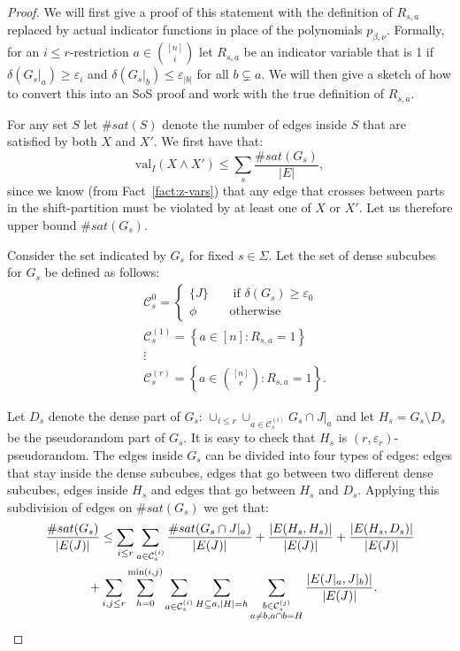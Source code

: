 \documentclass[11pt]{article}
\def \cC {\mathcal{C}}
\def \sos {SoS\xspace}
\def \eps {{\varepsilon}}
\def \val {\mathrm{val}}
\theoremstyle{definition}
\begin{document}
\begin{proof}
We will first give a proof of this statement with the definition of $R_{s,a}$ replaced by actual indicator functions in place of the polynomials $p_{\beta,\nu}$. Formally, for an $i \leq r$-restriction $a \in {[n] \choose i}$ let $R_{s,a}$ be an indicator variable that is 1 if $\delta(G_s|_a) \geq \eps_i$ and $\delta(G_s|_b) \leq \eps_{|b|}$ for all $b \subsetneq a$. We will then give a sketch of how to convert this into an \sos proof and work with the true definition of $R_{s,a}$.

For any set $S$ let $\#sat(S)$ denote the number of edges inside $S$ that are satisfied by both $X$ and $X'$. We first have that:
\begin{equation}\label{eq:edge_cover0}
\val_{I}(X \wedge X') \leq \sum_s \frac{\#sat(G_s)}{|E|},
\end{equation}
since we know (from Fact~\ref{fact:z-vars}) that any edge that crosses between parts in the shift-partition must be violated by at least one of $X$ or $X'$. Let us therefore upper bound $\#sat(G_s)$.


Consider the set indicated by $G_s$ for fixed $s \in \Sigma$. Let the set of dense subcubes for $G_s$ be defined as follows:
\begin{align*}
&\cC^0_s = \begin{cases}\{J\} ~~~~~~~~~\text{if $\delta(G_s) \geq \eps_0$} \\
\phi ~~~~~~~~~~~~\text{otherwise}
\end{cases} \\
&\cC^{(1)}_s = \left\{a \in [n]: R_{s,a} = 1\right\} \\
&\vdots \\
&\cC^{(r)}_s = \left\{a \in {[n] \choose r}: R_{s,a} = 1\right\}. 
\end{align*}


Let $D_s$ denote the dense part of $G_s$: $\cup_{i \leq r} \cup_{a \in \cC^{(i)}_s} G_s \cap J|_a$ and let $H_s = G_s \setminus D_s$ be the pseudorandom part of $G_s$. It is easy to check that $H_s$ is $(r, \eps_r)$-pseudorandom. The edges inside $G_s$ can be divided into four types of edges: edges that stay inside the dense subcubes, edges that go between two different dense subcubes, edges inside $H_s$ and edges that go between $H_s$ and $D_s$. Applying this subdivision of edges on $\#sat(G_s)$ we get that:
\begin{align}
\frac{\#sat(G_s)}{|E(J)|} 
&\leq \sum_{i \leq r} \sum_{a \in \cC^{(i)}_s} \frac{\#sat(G_s \cap J|_a)}{|E(J)|}  +
\frac{|E(H_s, H_s)|}{|E(J)|} + \frac{|E(H_s, D_s)|}{|E(J)|}\notag\\\label{eq:edge-cov1}
+ 
&\sum_{i, j \leq r} 
\sum\limits_{h=0}^{\min(i,j)}
\sum_{a \in \cC^{(i)}_s}
\sum_{H\subseteq a, |H| = h}
\sum_{\substack{b \in \cC^{(j)}_s \\ a \neq b, a\cap b = H}} \frac{|E(J|_a, J|_b)|}{|E(J)|}.
\end{align}


\end{proof}
\end{document}
